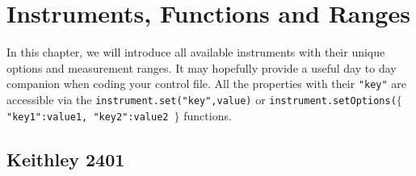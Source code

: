 %
\chapter{Instruments, Functions and Ranges}
\lettrine[lines=2]{\color{blue}\textsf{I}}{}n this chapter, we will introduce all available instruments with their unique options and measurement ranges. It may hopefully provide a useful day to day companion when coding your control file. All the properties with their \texttt{"key"} are accessible via the \texttt{instrument.set("key",value)} or \texttt{instrument.setOptions($\lbrace$"key1":value1, "key2":value2 $\rbrace $} functions.
\section{Keithley 2401}

